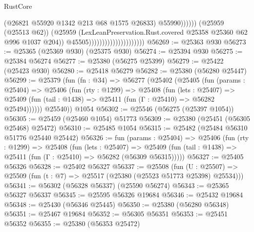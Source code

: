 \begin{lexlean}{RustCore}
\begin{coremodule}
                                                          (@26821
                                                            @55920
                                                            @1342
                                                            @213
                                                            @68
                                                            @1575
                                                            @26833)
                                                          @55990))))))
                                              (@25959 (@25513 @62))
                                              (@25959
                                                (LexLeanPreservation.Rust.covered
                                                  @25358
                                                  @25360
                                                  @62
                                                  @996
                                                  @1037
                                                  @204))
                                              @45505)))))))))))))))))))))
@56269 := @25363 @930
@56273 := @25365 (@25369 @930) (@25375 @930)
@56274 := @25394 @930
@56275 := @25384 @56274
@56277 := @25380 (@56275 @25399)
@56279 := @25422 (@25423 @930)
@56280 := @25418 @56279
@56282 := @25380 (@56280 @25447)
@56299 := @25379
    (fun (fn : @34) =>
    @56277
      (@25402
        (@25405
          (fun (params : @25404) =>
          @25406
            (fun (rty : @1299) =>
            @25408
              (fun (lets : @25407) =>
              @25409 (fun (tail : @1438) => @25411 (fun (Γ : @25410) => @56282 @25494))))))
        @25540))
    @1054
@56302 := @25546 (@56275 (@25397 @1054))
@56305 := @25459 (@25460 @1054) @51773
@56309 := @25380 (@25451 (@56305 @25468) @25472)
@56310 := @25485 @1054
@56315 := @25482 (@25484 @56310 @51776 @25440 @25442)
@56326 := fun (params : @25404) =>
  @25406
    (fun (rty : @1299) =>
    @25408
      (fun (lets : @25407) =>
      @25409 (fun (tail : @1438) => @25411 (fun (Γ : @25410) => @56282 (@56309 @56315)))))
@56327 := @25405 @56326
@56328 := @25402 @56327
@56337 := @25508
    (fun (U : @25507) => @25509 (fun (t : @7) => @25517 (@25380 (@25523 @51773 @25398) @25534)))
@56341 := @56302 (@56328 @56337) (@25590 @56274)
@56343 := @25365 @56327 @56337
@56345 := @25595 @56326 @19684
@56346 := @25432 @19684
@56348 := @25430 (@56346 @25445)
@56350 := @25380 (@56280 @56348)
@56351 := @25467 @19684
@56352 := @56305 @56351
@56353 := @25451 @56352
@56355 := @25380 (@56353 @25472)

\end{coremodule}
\end{lexlean}
